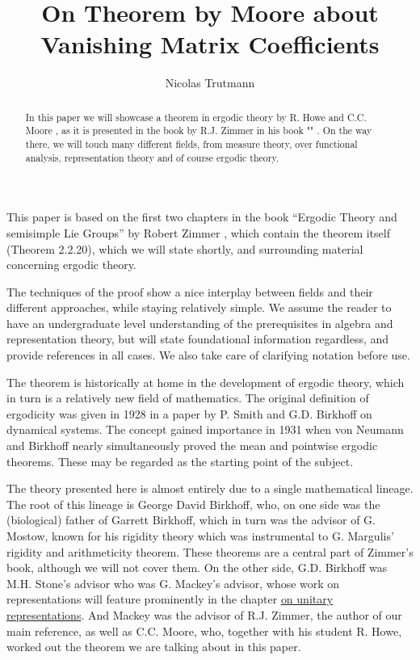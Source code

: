 \documentclass[
  12pt
]{article}
\title{On Theorem by Moore about Vanishing Matrix Coefficients}
\author{Nicolas Trutmann}
\date{}
\theoremstyle{plain}
\begin{document}
\maketitle

\begin{abstract}
  In this paper we will showcase a theorem in ergodic theory by R. Howe and
  C.C. Moore \cite{howe79}, as it is presented in the book by R.J. Zimmer in his
  book "" \cite{Zimmer84}.
  On the way there, we will touch many different
  fields, from measure theory, over functional analysis, representation
  theory and of course ergodic theory.
\end{abstract}

\newpage
\tableofcontents
\newpage


  This paper is based on the first two chapters in the book ``Ergodic Theory
  and semisimple Lie Groups'' by Robert Zimmer \cite{Zimmer84}, which contain
  the theorem itself (Theorem 2.2.20), which we will state shortly, and
  surrounding material concerning ergodic theory.

  The techniques of the proof show a nice interplay between fields and
  their different approaches, while staying relatively simple. We assume
  the reader to have an undergraduate level understanding of the
  prerequisites in algebra and representation theory, but will state
  foundational information regardless, and provide references in all
  cases. We also take care of clarifying notation before use.

  The theorem is historically at home in the
  development of ergodic theory, which in turn is a relatively new field
  of mathematics. The original definition of ergodicity was given in 1928
  in a paper by P. Smith and G.D. Birkhoff on dynamical systems. The concept
  gained importance in 1931 when von Neumann and Birkhoff nearly
  simultaneously proved the mean and pointwise ergodic theorems. These may
  be regarded as the starting point of the subject.

  The theory presented here is almost entirely due to a single mathematical
  lineage. The root of this lineage is George David Birkhoff, who, on one side was the
  (biological) father of Garrett Birkhoff, which in turn was the advisor of G. Mostow,
  known for his rigidity theory which was instrumental to G. Margulis' rigidity
  and arithmeticity theorem. These theorems are a central part of Zimmer's book,
  although we will not cover them. On the other side, G.D. Birkhoff was 
  M.H. Stone's advisor who was G. Mackey's advisor, whose work on representations will
  feature prominently in the chapter \hyperlink{the-direct-integral-and-unitary-representations}{on unitary representations}.
  And Mackey was the advisor of R.J. Zimmer, the author of our main reference, as
  well as C.C. Moore, who, together with his student R. Howe, worked out the
  theorem we are talking about in this paper.
\end{document}

